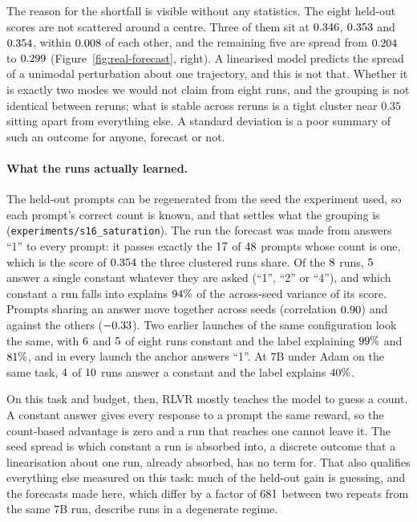 The reason for the shortfall is visible without any statistics. The eight held-out scores are not
scattered around a centre. Three of them sit at $0.346$, $0.353$ and $0.354$, within $0.008$ of
each other, and the remaining five are spread from $0.204$ to $0.299$
(Figure~\ref{fig:real-forecast}, right). A linearised model predicts the spread of a unimodal
perturbation about one trajectory, and this is not that. Whether it is exactly two modes we would
not claim from eight runs, and the grouping is not identical between reruns; what is stable across
reruns is a tight cluster near $0.35$ sitting apart from everything else. A standard deviation is a
poor summary of such an outcome for anyone, forecast or not.

\paragraph{What the runs actually learned.} The held-out prompts can be regenerated from the
seed the experiment used, so each prompt's correct count is known, and that settles what the
grouping is (\texttt{experiments/s16\_saturation}). The run the forecast was made from answers
``1'' to every prompt: it passes exactly the $17$ of $48$ prompts
whose count is one, which is the score of $0.354$ the three clustered runs share. Of the
$8$ runs, $5$ answer a single constant whatever they are asked
(``1'', ``2'' or ``4''), and which constant a run falls into explains $94\%$ of the
across-seed variance of its score. Prompts sharing an answer move together across seeds
(correlation $0.90$) and against the others ($-0.33$). Two earlier launches
of the same configuration look the same, with $6$ and
$5$ of eight runs constant and the label explaining
$99\%$ and $81\%$, and in every launch the anchor answers
``1''. At $7$B under Adam on the same task, $4$ of $10$ runs
answer a constant and the label explains $40\%$.

On this task and budget, then, RLVR mostly teaches the model to guess a count. A constant answer
gives every response to a prompt the same reward, so the count-based advantage is zero and a run
that reaches one cannot leave it. The seed spread is which constant a run is absorbed into, a
discrete outcome that a linearisation about one run, already absorbed, has no term for. That also
qualifies everything else measured on this task: much of the held-out gain is guessing, and the
forecasts made here, which differ by a factor of $681$ between two repeats from
the same $7$B run, describe runs in a degenerate regime.


